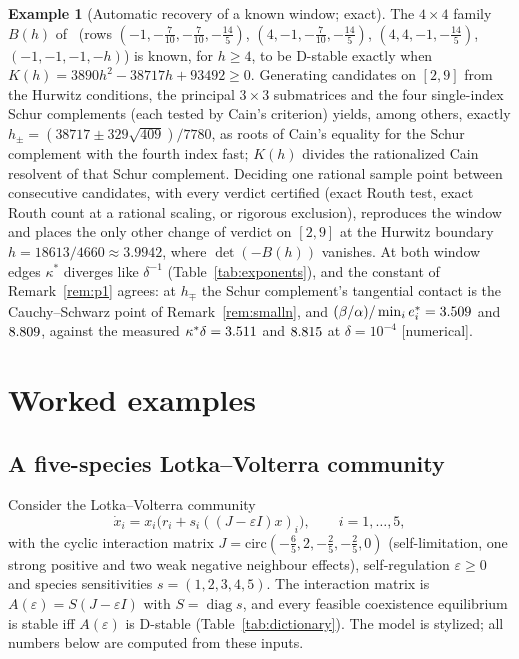 \documentclass[11pt,a4paper]{article}
\theoremstyle{plain}
\theoremstyle{definition}
\newtheorem{example}[theorem]{Example}
\newcommand{\diag}{\operatorname{diag}}
\newcommand{\ks}{\kappa^{*}}
\begin{document}
\begin{example}[Automatic recovery of a known window; exact]\label{ex:bh}
The $4\times4$ family $B(h)$ of~\cite{companion_attach} (rows $(-1,-\tfrac7{10},-\tfrac7{10},-\tfrac{14}5)$,
$(4,-1,-\tfrac7{10},-\tfrac{14}5)$, $(4,4,-1,-\tfrac{14}5)$, $(-1,-1,-1,-h)$) is known, for $h\ge4$, to be D-stable
exactly when $K(h)=3890h^2-38717h+93492\ge0$. Generating candidates on $[2,9]$ from the Hurwitz conditions, the
principal $3\times3$ submatrices and the four single-index Schur complements (each tested by Cain's criterion)
yields, among others, exactly $h_\pm=(38717\pm329\sqrt{409})/7780$, as roots of Cain's equality for the Schur
complement with the fourth index fast; $K(h)$ divides the rationalized Cain resolvent of that Schur complement.
Deciding one rational sample point between consecutive candidates, with every verdict certified (exact Routh
test, exact Routh count at a rational scaling, or rigorous exclusion), reproduces the window and places the only
other change of verdict on $[2,9]$ at the Hurwitz boundary $h=18613/4660\approx3.9942$, where $\det(-B(h))$
vanishes. At both window edges
$\ks$ diverges like $\delta^{-1}$ (Table~\ref{tab:exponents}), and the constant of Remark~\ref{rem:p1} agrees: at
$h_\mp$ the Schur complement's tangential contact is the Cauchy--Schwarz point of Remark~\ref{rem:smalln}, and
$(\beta/\alpha)/\min_ie^{*}_i=3.509$ and $8.809$, against the measured $\ks\delta=\CmeasMinus$ and
$8.815$ at $\delta=10^{-4}$ [numerical].
\end{example}

\section{Worked examples}\label{sec:examples}

\subsection{A five-species Lotka--Volterra community}\label{sec:w1}

Consider the Lotka--Volterra community
\[\dot x_i=x_i\bigl(r_i+s_i((J-\varepsilon I)x)_i\bigr),\qquad i=1,\dots,5,\]
with the cyclic interaction matrix
$J=\mathrm{circ}(-\tfrac65,2,-\tfrac25,-\tfrac25,0)$ (self-limitation, one strong positive and two weak negative
neighbour effects), self-regulation $\varepsilon\ge0$ and species sensitivities $s=(1,2,3,4,5)$. The interaction
matrix is $A(\varepsilon)=S(J-\varepsilon I)$ with $S=\diag s$, and every feasible coexistence equilibrium is stable
iff $A(\varepsilon)$ is D-stable (Table~\ref{tab:dictionary}). The model is stylized; all numbers below are
computed from these inputs.
\end{document}
